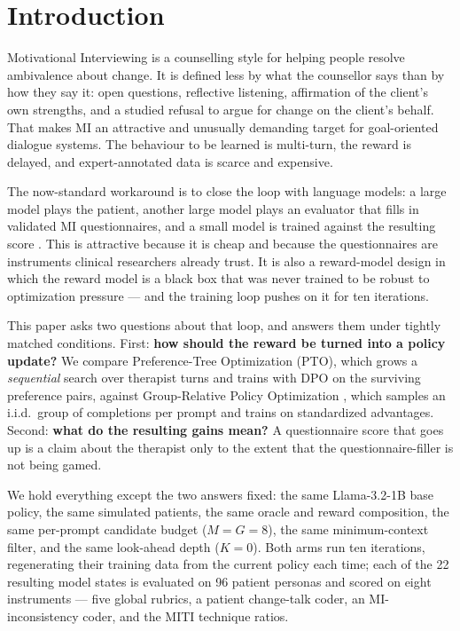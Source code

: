 \section{Introduction}
\label{sec:intro}

Motivational Interviewing \citep[MI;][]{miller1991mi} is a counselling style for helping
people resolve ambivalence about change. It is defined less by what the counsellor says
than by how they say it: open questions, reflective listening, affirmation of the client's
own strengths, and a studied refusal to argue for change on the client's behalf. That
makes MI an attractive and unusually demanding target for goal-oriented dialogue systems.
The behaviour to be learned is multi-turn, the reward is delayed, and expert-annotated
data is scarce and expensive.

The now-standard workaround is to close the loop with language models: a large model plays
the patient, another large model plays an evaluator that fills in validated MI
questionnaires, and a small model is trained against the resulting score
\citep{yosef2024assessing, baruch2025pto}. This is attractive because it is cheap and
because the questionnaires are instruments clinical researchers already trust. It is also
a reward-model design in which the reward model is a black box that was never trained to
be robust to optimization pressure --- and the training loop pushes on it for ten
iterations.

This paper asks two questions about that loop, and answers them under tightly matched
conditions. First: \textbf{how should the reward be turned into a policy update?} We compare
Preference-Tree Optimization (PTO), which grows a \emph{sequential} search over therapist
turns and trains with DPO \citep{rafailov2023dpo} on the surviving preference pairs,
against Group-Relative Policy Optimization \citep[GRPO;][]{shao2024deepseekmath}, which
samples an i.i.d.\ group of completions per prompt and trains on standardized advantages.
Second: \textbf{what do the resulting gains mean?} A questionnaire score that goes up is a
claim about the therapist only to the extent that the questionnaire-filler is not being
gamed.

We hold everything except the two answers fixed: the same Llama-3.2-1B base policy, the
same simulated patients, the same \primaryjudge{} oracle and reward composition, the same
per-prompt candidate budget ($M = G = 8$), the same minimum-context filter, and the same
look-ahead depth ($K=0$). Both arms run ten iterations, regenerating their training data
from the current policy each time; each of the 22 resulting model states is evaluated on
96 patient personas and scored on eight instruments --- five global rubrics, a patient
change-talk coder, an MI-inconsistency coder, and the MITI technique ratios.

